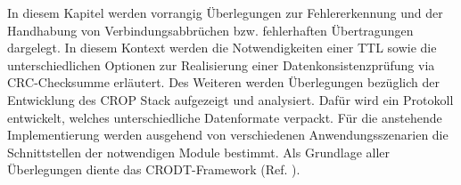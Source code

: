 \label{cap:konzept}

In diesem Kapitel werden vorrangig {\"U}berlegungen zur Fehlererkennung
und der Handhabung von Verbindungsabbr{\"u}chen bzw. fehlerhaften
{\"U}bertragungen dargelegt. In diesem Kontext werden die Notwendigkeiten einer
\gls{TTL} sowie die unterschiedlichen Optionen zur
Realisierung einer Datenkonsistenzpr{\"u}fung via CRC-Checksumme erl{\"a}utert.
Des Weiteren werden {\"U}berlegungen bez{\"u}glich der Entwicklung des
\gls{CROP} Stack aufgezeigt und analysiert. Dafür wird ein Protokoll entwickelt,
welches unterschiedliche Datenformate verpackt. Für die anstehende
Implementierung werden ausgehend von verschiedenen Anwendungsszenarien die
Schnittstellen der notwendigen Module bestimmt. Als Grundlage aller
{\"U}berlegungen diente das CRODT-Framework (Ref. \cite{Daher}).
